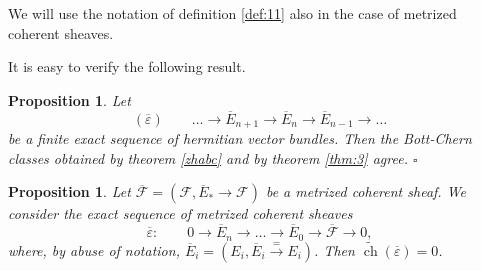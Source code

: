\documentclass[10pt,twoside]{article}
\numberwithin{equation}{section}
\theoremstyle{plain}
\newtheorem{proposition}[equation]{Proposition}
\theoremstyle{definition}
\DeclareMathOperator{\ch}{ch}
\begin{document}
We will use the notation of definition \ref{def:11} also in the case
of metrized coherent sheaves.


It is easy to verify the following result.

\begin{proposition}\label{prop:16} Let 
$$(\overline{\varepsilon})\qquad \ldots \longrightarrow
\overline{E}_{n+1} \longrightarrow
\overline{E}_n \longrightarrow
\overline{E}_{n-1} \longrightarrow \ldots$$ 
be a finite exact sequence of hermitian vector bundles. Then the
Bott-Chern classes obtained by theorem \ref{zhabc} and by theorem
\ref{thm:3} agree.
\hfill$\square$
\end{proposition}

\begin{proposition}\label{prop:19} Let $\overline
  {\mathcal{F}}=(\mathcal{F},\overline E_{\ast}\to\mathcal{F})$ be a
  metrized coherent sheaf. We consider the exact sequence of metrized
  coherent sheaves
  \begin{displaymath}
    \overline{\varepsilon }\colon\qquad 0\longrightarrow 
    \overline E_{n}\to\dots\to\overline E_{0}\to 
    \overline{\mathcal{F}}\to 0,
  \end{displaymath}
  where, by abuse of notation, $\overline E_{i}=(E_{i},\overline
  E_{i}\overset {=}{\to} E_{i})$.
  Then $\widetilde {\ch}(\overline{\varepsilon })=0$.
\end{proposition}
\end{document}
